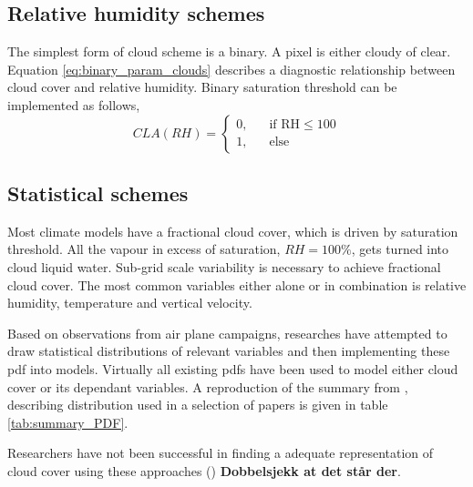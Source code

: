 

\subsection{Relative humidity schemes}
The simplest form of cloud scheme is a binary. A pixel is either cloudy of clear. Equation \eqref{eq:binary_param_clouds} describes a diagnostic relationship between cloud cover and relative humidity. Binary saturation threshold can be implemented as follows,
\begin{equation} \label{eq:binary_param_clouds}
    CLA\left(RH\right) = 
     \begin{cases}
       \text{0,} &\quad\text{if RH}\le100\\
       \text{1,} &\quad\text{else}
     \end{cases}
\end{equation}

\subsection{Statistical schemes}
Most climate models have a fractional cloud cover, which is driven by saturation threshold. All the vapour in excess of saturation, $RH=100\%$, gets turned into cloud liquid water. Sub-grid scale variability is necessary to achieve fractional cloud cover. The most common variables either alone or in combination is relative humidity, temperature and vertical velocity. 

Based on observations from air plane campaigns, researches have attempted to draw statistical distributions of relevant variables and then implementing these \acrshort{pdf} into models. Virtually all existing \acrshort{pdf}s have been used to model either cloud cover or its dependant variables. %
A reproduction of the summary from \cite{Tompkins2009CloudParametrization}, describing distribution used in a selection of papers is given in table \ref{tab:summary_PDF}.

Researchers have not been successful in finding a adequate representation of cloud cover using these approaches (\cite{Tompkins2009CloudParametrization}) \textbf{Dobbelsjekk at det står der}. 


